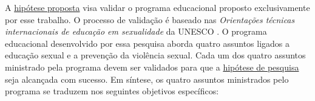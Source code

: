 
\vspace{-0.2cm}

A \hyperref[hipotese]{hipótese proposta} visa validar o programa educacional proposto exclusivamente por esse trabalho. O processo de validação é baseado nas \textit{Orientações técnicas internacionais de educação em sexualidade} da UNESCO \cite{women2018international}. O programa educacional desenvolvido por essa pesquisa aborda quatro assuntos ligados a educação sexual e a prevenção da violência sexual. Cada um dos quatro assuntos ministrado pela programa devem ser validados para que a \hyperref[hipotese]{hipótese de pesquisa} seja alcançada com sucesso. Em síntese, os quatro assuntos ministrados pelo programa se traduzem nos seguintes objetivos específicos: 

